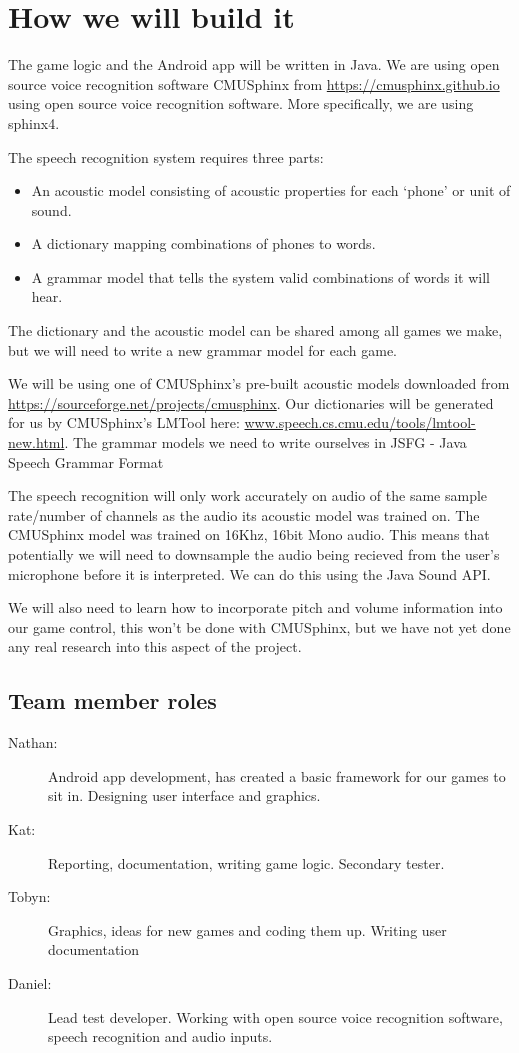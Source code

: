 \documentclass[11pt, oneside]{article}
\begin{document}
\section*{How we will build it}

The game logic and the Android app will be written in Java. We are
using open source voice recognition software CMUSphinx from
\url{https://cmusphinx.github.io} using open source voice recognition
software. More specifically, we are using sphinx4.

The speech recognition system requires three parts:
\begin{itemize}
\item An acoustic model consisting of acoustic properties for each
  `phone' or unit of sound.
\item A dictionary mapping combinations of phones to words.
\item A grammar model that tells the system valid combinations of
  words it will hear.
\end{itemize}

The dictionary and the acoustic model can be shared among all games we
make, but we will need to write a new grammar model for each game.

We will be using one of CMUSphinx's pre-built acoustic models
downloaded from \url{https://sourceforge.net/projects/cmusphinx}. Our
dictionaries will be generated for us by CMUSphinx's LMTool here:
\url{www.speech.cs.cmu.edu/tools/lmtool-new.html}. The grammar models
we need to write ourselves in JSFG - Java Speech Grammar Format

The speech recognition will only work accurately on audio of the same
sample rate/number of channels as the audio its acoustic model was
trained on. The CMUSphinx model was trained on 16Khz, 16bit Mono
audio. This means that potentially we will need to downsample the
audio being recieved from the user's microphone before it is
interpreted. We can do this using the Java Sound API.

We will also need to learn how to incorporate pitch and volume
information into our game control, this won't be done with CMUSphinx,
but we have not yet done any real research into this aspect of the
project.


\subsection*{Team member roles}

\begin{description}
\item [Nathan:] Android app development, has created a basic framework
  for our games to sit in. Designing user interface and graphics.
\item [Kat:] Reporting, documentation, writing game logic. Secondary tester.
\item [Tobyn:] Graphics, ideas for new games and coding them
  up. Writing user documentation
\item [Daniel:] Lead test developer. Working with open source voice
  recognition software, speech recognition and audio inputs.
\end{description}
\end{document}
